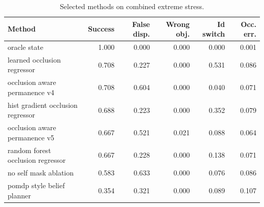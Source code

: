 \begin{table}[t]
\centering
\caption{Selected methods on combined extreme stress.}
\label{tab:selected-split}
\small
\begin{tabular}{lrrrrr}
\toprule
Method & Success & False disp. & Wrong obj. & Id switch & Occ. err. \\
\midrule
oracle state & 1.000 & 0.000 & 0.000 & 0.000 & 0.001 \\
learned occlusion regressor & 0.708 & 0.227 & 0.000 & 0.531 & 0.086 \\
occlusion aware permanence v4 & 0.708 & 0.604 & 0.000 & 0.040 & 0.071 \\
hist gradient occlusion regressor & 0.688 & 0.223 & 0.000 & 0.352 & 0.079 \\
occlusion aware permanence v5 & 0.667 & 0.521 & 0.021 & 0.088 & 0.064 \\
random forest occlusion regressor & 0.667 & 0.228 & 0.000 & 0.138 & 0.071 \\
no self mask ablation & 0.583 & 0.633 & 0.000 & 0.076 & 0.086 \\
pomdp style belief planner & 0.354 & 0.321 & 0.000 & 0.089 & 0.107 \\
\bottomrule
\end{tabular}
\end{table}
